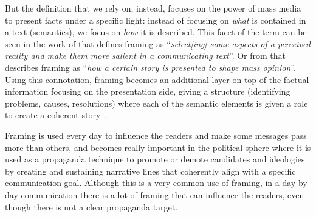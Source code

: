 But the definition that we rely on, instead, focuses on the power of mass media to present facts under a specific light: instead of focusing on \emph{what} is contained in a text (semantics), we focus on \emph{how} it is described.
This facet of the term can be seen in the work of
\citet{entman1993framing} that defines framing as ``\textit{select[ing] some aspects of a perceived reality and make them more salient in a communicating text}''.
Or from \citet{goffman1974frame} that describes framing as ``\textit{how a certain story is presented to shape mass opinion}''.
Using this connotation, framing becomes an additional layer on top of the factual information focusing on the presentation side, giving a structure (identifying problems, causes, resolutions) where each of the semantic elements is given a role to create a coherent story~\cite{pan1993framing}.

Framing is used every day to influence the readers and make some messages pass more than others, and becomes really important in the political sphere where it is used as a propaganda technique to promote or demote candidates and ideologies by creating and sustaining narrative lines that coherently align with a specific communication goal.
Although this is a very common use of framing, in a day by day communication there is a lot of framing that can influence the readers, even though there is not a clear propaganda target.



